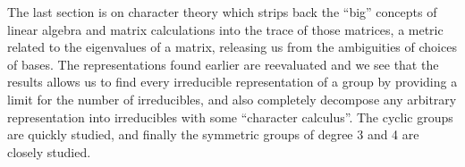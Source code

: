 	The last section is on character theory which strips back the ``big'' concepts of linear algebra and matrix calculations into the trace of those matrices, a metric related to the eigenvalues of a matrix, releasing us from the ambiguities of choices of bases. The representations found earlier are reevaluated and we see that the results allows us to find every irreducible representation of a group by providing a limit for the number of irreducibles, and also completely decompose any arbitrary representation into irreducibles with some ``character calculus''. The cyclic groups are quickly studied, and finally the symmetric groups of degree 3 and 4 are closely studied.